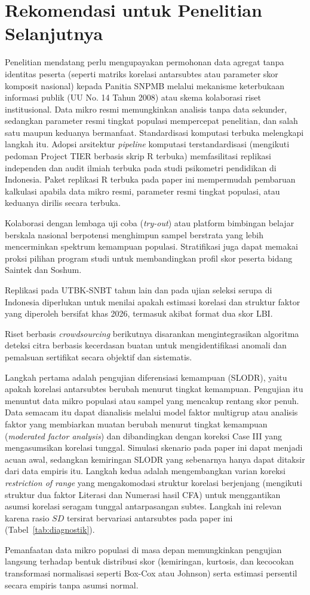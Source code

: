 \section{Rekomendasi untuk Penelitian Selanjutnya}

Penelitian mendatang perlu mengupayakan permohonan data agregat tanpa identitas peserta (seperti matriks korelasi antarsubtes atau parameter skor komposit nasional) kepada Panitia SNPMB melalui mekanisme keterbukaan informasi publik (UU No. 14 Tahun 2008) atau skema kolaborasi riset institusional. Data mikro resmi memungkinkan analisis tanpa data sekunder, sedangkan parameter resmi tingkat populasi mempercepat penelitian, dan salah satu maupun keduanya bermanfaat. Standardisasi komputasi terbuka melengkapi langkah itu. Adopsi arsitektur \textit{pipeline} komputasi terstandardisasi (mengikuti pedoman Project TIER berbasis skrip R terbuka) memfasilitasi replikasi independen dan audit ilmiah terbuka pada studi psikometri pendidikan di Indonesia. Paket replikasi R terbuka pada paper ini mempermudah pembaruan kalkulasi apabila data mikro resmi, parameter resmi tingkat populasi, atau keduanya dirilis secara terbuka.

Kolaborasi dengan lembaga uji coba (\textit{try-out}) atau platform bimbingan belajar berskala nasional berpotensi menghimpun sampel berstrata yang lebih mencerminkan spektrum kemampuan populasi. Stratifikasi juga dapat memakai proksi pilihan program studi untuk membandingkan profil skor peserta bidang Saintek dan Soshum.

Replikasi pada UTBK-SNBT tahun lain dan pada ujian seleksi serupa di Indonesia diperlukan untuk menilai apakah estimasi korelasi dan struktur faktor yang diperoleh bersifat khas 2026, termasuk akibat format dua skor LBI.

Riset berbasis \textit{crowdsourcing} berikutnya disarankan mengintegrasikan algoritma deteksi citra berbasis kecerdasan buatan untuk mengidentifikasi anomali dan pemalsuan sertifikat secara objektif dan sistematis.

Langkah pertama adalah pengujian diferensiasi kemampuan (SLODR), yaitu apakah korelasi antarsubtes berubah menurut tingkat kemampuan. Pengujian itu menuntut data mikro populasi atau sampel yang mencakup rentang skor penuh. Data semacam itu dapat dianalisis melalui model faktor multigrup atau analisis faktor yang membiarkan muatan berubah menurut tingkat kemampuan (\textit{moderated factor analysis}) dan dibandingkan dengan koreksi Case III yang mengasumsikan korelasi tunggal. Simulasi skenario pada paper ini dapat menjadi acuan awal, sedangkan kemiringan SLODR yang sebenarnya hanya dapat ditaksir dari data empiris itu. Langkah kedua adalah mengembangkan varian koreksi \textit{restriction of range} yang mengakomodasi struktur korelasi berjenjang (mengikuti struktur dua faktor Literasi dan Numerasi hasil CFA) untuk menggantikan asumsi korelasi seragam tunggal antarpasangan subtes. Langkah ini relevan karena rasio $SD$ tersirat bervariasi antarsubtes pada paper ini (Tabel~\ref{tab:diagnostik}).

Pemanfaatan data mikro populasi di masa depan memungkinkan pengujian langsung terhadap bentuk distribusi skor (kemiringan, kurtosis, dan kecocokan transformasi normalisasi seperti Box-Cox atau Johnson) serta estimasi persentil secara empiris tanpa asumsi normal.